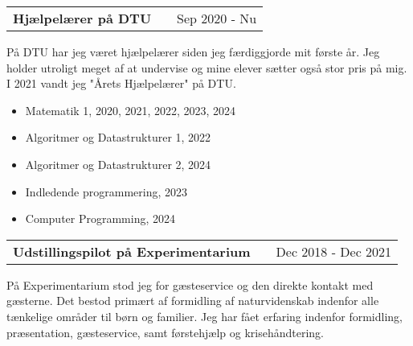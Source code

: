 \documentclass[a4paper,12pt]{article}
\makeatletter
\newenvironment{jobshort}[2]
    {
    \begin{tabularx}{\linewidth}{@{}l X r@{}}
    \textbf{#1} & \hfill &  #2 \\[3.75pt]
    \end{tabularx}
    }
    {
    }
\makeatother
\begin{document}
\begin{jobshort}{Hjælpelærer på DTU}{Sep 2020 - Nu}
På DTU har jeg været hjælpelærer siden jeg færdiggjorde mit første år. Jeg holder utroligt meget af at undervise og mine elever sætter også stor pris på mig. I 2021 vandt jeg "Årets Hjælpelærer" på DTU. 
\begin{minipage}[t]{\linewidth}\vspace{-3pt}
\begin{itemize}[nosep,after=\strut, leftmargin=1em, itemsep=3pt,label=--]
    \item Matematik 1, 2020, 2021, 2022, 2023, 2024
    \item Algoritmer og Datastrukturer 1, 2022
    \item Algoritmer og Datastrukturer 2, 2024
    \item Indledende programmering, 2023
    \item Computer Programming, 2024
\end{itemize}
\end{minipage}
\end{jobshort}


\begin{jobshort}{Udstillingspilot på Experimentarium}{Dec 2018 - Dec 2021}
På Experimentarium stod jeg for gæsteservice og den direkte kontakt med gæsterne. Det bestod primært af formidling af naturvidenskab indenfor alle tænkelige områder til børn og familier. Jeg har fået erfaring indenfor formidling, præsentation, gæsteservice, samt førstehjælp og krisehåndtering. 
\end{jobshort}
  

\end{document}

